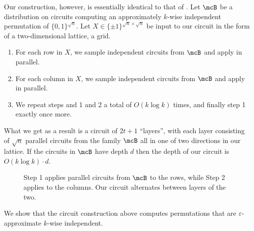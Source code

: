 Our construction, however, is essentially identical to that of \cite{harrow2023approximate}. Let $\mcB$ be a distribution on circuits computing an approximately $k$-wise independent permutation of $\{0,1\}^{\sqrt{n}}$. Let $X \in \{\pm1\}^{\sqrt{n}\times \sqrt{n}}$ be input to our circuit in the form of a two-dimensional lattice, a grid. 
\begin{enumerate}
    \item For each row in $X$, we sample independent circuits from $\mcB$ and apply in parallel.
    \item For each column in $X$, we sample independent circuits from $\mcB$ and apply in parallel.
    \item We repeat steps and 1 and 2 a total of $O(k\log k)$ times, and finally step 1 exactly once more.
\end{enumerate}

What we get as a result is a circuit of $2t+1$ ``layers'', with each layer consisting of $\sqrt{n}$ parallel circuits from the family $\mcB$ all in one of two directions in our lattice. If the circuits in $\mcB$ have depth $d$ then the depth of our circuit is $O(k\log k) \cdot d$.

\begin{figure}[h]
    \centering
    \vspace{10px}
    \caption{Step 1 applies parallel circuits from $\mcB$ to the rows, while Step 2 applies to the columns. Our circuit alternates between layers of the two.}
    \label{fig:gridcircuit}
\end{figure}
We show that the circuit construction above computes permutations that are $\varepsilon$-approximate $k$-wise independent.

